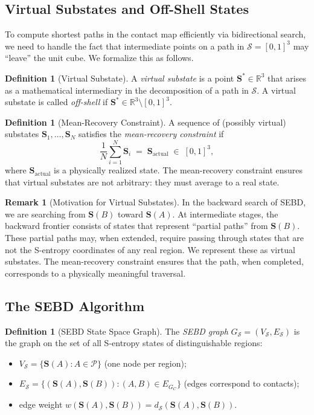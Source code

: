\documentclass[twocolumn]{article}
\theoremstyle{plain}
\theoremstyle{definition}
\newtheorem{definition}[theorem]{Definition}
\newtheorem{remark}[theorem]{Remark}
\newcommand{\PP}{\mathcal{P}}
\newcommand{\SS}{\mathcal{S}}
\newcommand{\bS}{\mathbf{S}}
\newcommand{\dS}{d_{\mathcal{S}}}
\newcommand{\reals}{\mathbb{R}}
\begin{document}
\subsection{Virtual Substates and Off-Shell States}

To compute shortest paths in the contact map efficiently via bidirectional search,
we need to handle the fact that intermediate points on a path in $\SS = [0,1]^3$
may ``leave'' the unit cube. We formalize this as follows.

\begin{definition}[Virtual Substate]
\label{def:virtualsubstate}
A \emph{virtual substate} is a point $\bS^* \in \reals^3$ that arises as a
mathematical intermediary in the decomposition of a path in $\SS$. A virtual
substate is called \emph{off-shell} if $\bS^* \in \reals^3 \setminus [0,1]^3$.
\end{definition}

\begin{definition}[Mean-Recovery Constraint]
\label{def:meanrecovery}
A sequence of (possibly virtual) substates $\bS_1, \ldots, \bS_N$ satisfies the
\emph{mean-recovery constraint} if
\[
  \frac{1}{N} \sum_{i=1}^N \bS_i \;=\; \bS_{\text{actual}} \;\in\; [0,1]^3,
\]
where $\bS_{\text{actual}}$ is a physically realized state. The mean-recovery
constraint ensures that virtual substates are not arbitrary: they must average to
a real state.
\end{definition}

\begin{remark}[Motivation for Virtual Substates]
In the backward search of SEBD, we are searching from $\bS(B)$ toward $\bS(A)$.
At intermediate stages, the backward frontier consists of states that represent
``partial paths'' from $\bS(B)$. These partial paths may, when extended, require
passing through states that are not the S-entropy coordinates of any real region.
We represent these as virtual substates. The mean-recovery constraint ensures
that the path, when completed, corresponds to a physically meaningful traversal.
\end{remark}

\subsection{The SEBD Algorithm}

\begin{definition}[SEBD State Space Graph]
\label{def:sebdgraph}
The \emph{SEBD graph} $G_{\SS} = (V_\SS, E_\SS)$ is the graph on the set of
all S-entropy states of distinguishable regions:
\begin{itemize}
\item $V_\SS = \{\bS(A) : A \in \PP\}$ (one node per region);
\item $E_\SS = \{(\bS(A), \bS(B)) : (A,B) \in E_{G_C}\}$ (edges correspond to contacts);
\item edge weight $w(\bS(A), \bS(B)) = \dS(\bS(A), \bS(B))$.
\end{itemize}
\end{definition}
\end{document}
